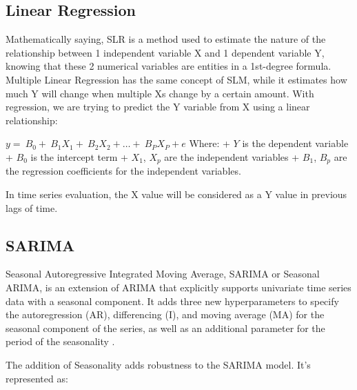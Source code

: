 \documentclass{ieeeojies}
\begin{document}
\subsection{Linear Regression}
\hspace{0.4cm}Mathematically saying, SLR is a method used to estimate the nature of the relationship between 1 independent variable X and 1 dependent variable Y, knowing that these 2 numerical variables are entities in a 1st-degree formula. Multiple Linear Regression has the same concept of SLM, while it estimates how much Y will change when multiple Xs change by a certain amount. With regression, we are trying to predict the Y variable from X using a linear relationship: \cite{sachconcua}\newline

$y=\ B_0+\ B_1X_1+\ B_2X_2+\ldots+\ B_PX_P+e$ 
\newline
	\newline Where:
\newline + $Y$ is the dependent variable
\newline + $B_0$ is the intercept term
\newline + $X_1$, $X_p$ are the independent variables
\newline + $B_1$, $B_p$ are the regression coefficients for the independent variables. 

\begin{flushleft}
\hspace{0.4cm}In time series evaluation, the X value will be considered as a Y value in previous lags of time.
\end{flushleft}    

\subsection{SARIMA}
\hspace{0.4cm}Seasonal Autoregressive Integrated Moving Average, SARIMA or Seasonal ARIMA, is an extension of ARIMA that explicitly supports univariate time series data with a seasonal component. It adds three new hyperparameters to specify the autoregression (AR), differencing (I), and moving average (MA) for the seasonal component of the series, as well as an additional parameter for the period of the seasonality \cite{sarima1}. 

The addition of Seasonality adds robustness to the SARIMA model. It’s represented as:\newline
\end{document}
